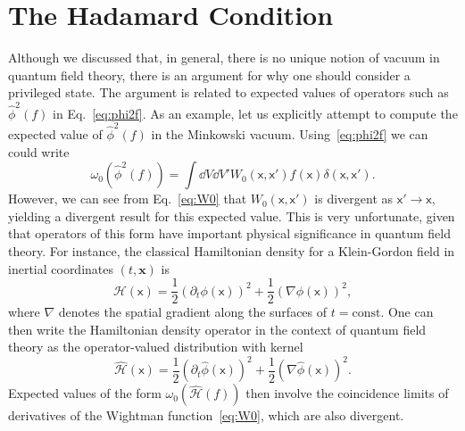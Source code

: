 \documentclass[letterpaper,12pt,titlepage,oneside,final]{book}
\newcommand{\mf}{\mathsf}%
\begin{document}
\section{The Hadamard Condition}\label{sec:Hadamard}


Although we discussed that, in general, there is no unique notion of vacuum in quantum field theory, there is an argument for why one should consider a privileged state. The argument is related to expected values of operators such as $\hat{\phi}^2(f)$ in Eq.~\eqref{eq:phi2f}. As an example, let us explicitly attempt to compute the expected value of $\hat{\phi}^2(f)$ in the Minkowski vacuum. Using~\eqref{eq:phi2f} we can could write
\begin{equation}
    \omega_0(\hat{\phi}^2(f)) = \int \dd V \dd V' W_0(\mf x, \mf x')f(\mf x)\delta(\mf x,\mf x').
\end{equation}
However, we can see from Eq.~\eqref{eq:W0} that $W_0(\mf x, \mf x')$ is divergent as $\mf x'\to\mf x$, yielding a divergent result for this expected value. This is very unfortunate, given that operators of this form have important physical significance in quantum field theory. For instance, the classical Hamiltonian density for a Klein-Gordon field in inertial coordinates $(t,\bm x)$ is
\begin{equation}
    \mathcal{H}(\mf x) = \frac{1}{2}(\partial_t \phi(\mf x))^2 + \frac{1}{2}(\nabla\phi(\mf x))^2,
\end{equation}
where $\nabla$ denotes the spatial gradient along the surfaces of $t = \text{const}$. One can then write the Hamiltonian density operator in the context of quantum field theory as the operator-valued distribution with kernel
\begin{equation}
    \hat{\mathcal{H}}(\mf x) = \frac{1}{2}(\partial_t \hat{\phi}(\mf x))^2 + \frac{1}{2}(\nabla\hat{\phi}(\mf x))^2.
\end{equation}
Expected values of the form $\omega_0(\hat{\mathcal{H}}(f))$ then involve the coincidence limits of derivatives of the Wightman function~\eqref{eq:W0}, which are also divergent.
\end{document}
